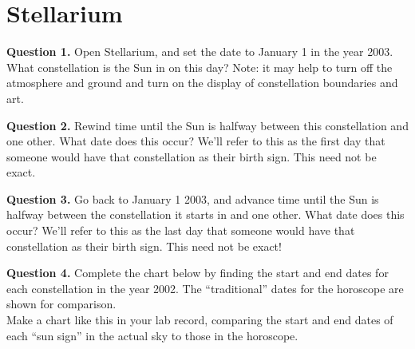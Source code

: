 \documentclass[11pt]{article}
\begin{document}
\newpage
\section{Stellarium}

\textbf{Question 1.} Open Stellarium, and set the date to January 1 in the year 2003. What constellation is the Sun in on this day? Note: it may help to turn off the atmosphere and ground and turn on the display of constellation boundaries and art.\\

\vspace{1.5cm}

\textbf{Question 2.} Rewind time until the Sun is halfway between this constellation and one other. What date does this occur? We'll refer to this as the first day that someone would have that constellation as their birth sign. This need not be exact.\\

\vspace{1.5cm}

\textbf{Question 3.} Go back to January 1 2003, and advance time until the Sun is halfway between the constellation it starts in and one other. What date does this occur? We'll refer to this as the last day that someone would have that constellation as their birth sign. This need not be exact!\\

\vspace{1.5cm}

\newpage

\textbf{Question 4.} Complete the chart below by finding the start and end dates for each constellation in the year 2002. The ``traditional'' dates for the horoscope are shown for comparison.\\

Make a chart like this in your lab record, comparing the start and end dates of each ``sun sign'' in the actual sky to those in the horoscope.
\end{document}

